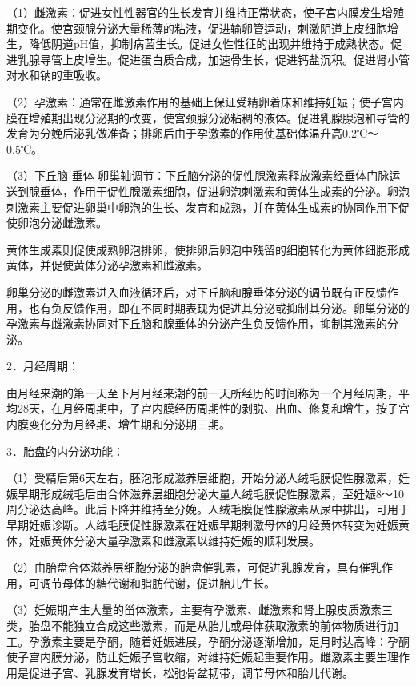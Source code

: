 \documentclass[12pt,UTF8,openany]{ctexbook}
\begin{document}
（1）雌激素：促进女性性器官的生长发育并维持正常状态，使子宫内膜发生增殖期变化。使宫颈腺分泌大量稀薄的粘液，促进输卵管运动，刺激阴道上皮细胞增生，降低阴道pH值，抑制病菌生长。促进女性性征的出现并维持于成熟状态。促进乳腺导管上皮增生。促进蛋白质合成，加速骨生长，促进钙盐沉积。促进肾小管对水和钠的重吸收。

（2）孕激素：通常在雌激素作用的基础上保证受精卵着床和维持妊娠；使子宫内膜在增殖期出现分泌期的改变，使宫颈腺分泌粘稠的液体。促进乳腺腺泡和导管的发育为分娩后泌乳做准备；排卵后由于孕激素的作用使基础体温升高0.2℃～0.5℃。

（3）下丘脑-垂体-卵巢轴调节：下丘脑分泌的促性腺激素释放激素经垂体门脉运送到腺垂体，作用于促性腺激素细胞，促进卵泡刺激素和黄体生成素的分泌。卵泡刺激素主要促进卵巢中卵泡的生长、发育和成熟，并在黄体生成素的协同作用下促使卵泡分泌雌激素。

黄体生成素则促使成熟卵泡排卵，使排卵后卵泡中残留的细胞转化为黄体细胞形成黄体，并促使黄体分泌孕激素和雌激素。

卵巢分泌的雌激素进入血液循环后，对下丘脑和腺垂体分泌的调节既有正反馈作用，也有负反馈作用，即在不同时期表现为促进其分泌或抑制其分泌。卵巢分泌的孕激素与雌激素协同对下丘脑和腺垂体的分泌产生负反馈作用，抑制其激素的分泌。

2．月经周期：

由月经来潮的第一天至下月月经来潮的前一天所经历的时间称为一个月经周期，平均28天，在月经周期中，子宫内膜经历周期性的剥脱、出血、修复和增生，按子宫内膜变化分为月经期、增生期和分泌期三期。

3．胎盘的内分泌功能：

（1）受精后第6天左右，胚泡形成滋养层细胞，开始分泌人绒毛膜促性腺激素，妊娠早期形成绒毛后由合体滋养层细胞分泌大量人绒毛膜促性腺激素，至妊娠8～10周分泌达高峰。此后下降并维持至分娩。人绒毛膜促性腺激素从尿中排出，可用于早期妊娠诊断。人绒毛膜促性腺激素在妊娠早期刺激母体的月经黄体转变为妊娠黄体，妊娠黄体分泌大量孕激素和雌激素以维持妊娠的顺利发展。

（2）由胎盘合体滋养层细胞分泌的胎盘催乳素，可促进乳腺发育，具有催乳作用，可调节母体的糖代谢和脂肪代谢，促进胎儿生长。

（3）妊娠期产生大量的甾体激素，主要有孕激素、雌激素和肾上腺皮质激素三类，胎盘不能独立合成这些激素，而是从胎儿或母体获取激素的前体物质进行加工。孕激素主要是孕酮，随着妊娠进展，孕酮分泌逐渐增加，足月时达高峰：孕酮使子宫内膜分泌，防止妊娠子宫收缩，对维持妊娠起重要作用。雌激素主要生理作用是促进子宫、乳腺发育增长，松弛骨盆韧带，调节母体和胎儿代谢。
\end{document}
